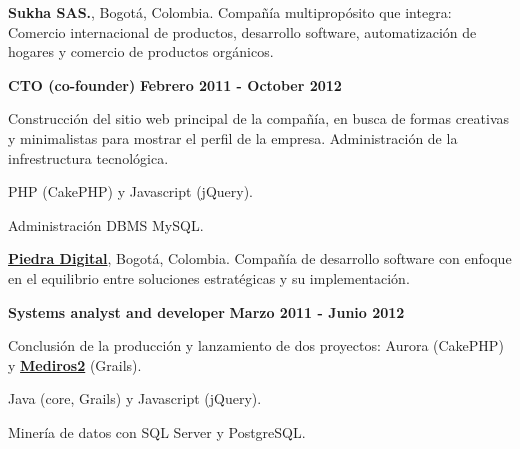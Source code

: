 \quarterblankline

% 

\textbf{Sukha SAS.}, Bogot\'a, Colombia.
Compa\~n\'ia multiprop\'osito que integra: Comercio internacional de productos,
desarrollo software, automatizaci\'on de hogares y comercio de productos
org\'anicos.
\begin{outerlist}
\item[] \textbf{CTO (co-founder)} \hfill \textbf{Febrero 2011 -
October 2012}
    \begin{innerlist}
\item Construcci\'on del sitio web principal de la compa\~n\'ia, en busca de
formas creativas y minimalistas para mostrar el perfil de la empresa.
Administraci\'on de la infrestructura tecnol\'ogica.
\item PHP (CakePHP) y Javascript (jQuery).
\item Administraci\'on DBMS MySQL.
    \end{innerlist}
\end{outerlist}

\quarterblankline

\href{http://www.piedradigital.com/}{\textbf{Piedra Digital}}, Bogot\'a,
Colombia. Compa\~n\'ia de desarrollo software con enfoque en el equilibrio entre
soluciones estrat\'egicas y su implementaci\'on.
\begin{outerlist}
\item[] \textbf{Systems analyst and developer} \hfill \textbf{Marzo 2011 - Junio
2012}
    \begin{innerlist}
\item Conclusi\'on de la producci\'on y lanzamiento de dos proyectos: Aurora
(CakePHP) y
\href{http://demo.100grados.co:8080/desempeno100/}{\textbf{Mediros2}} (Grails).
\item Java (core, Grails) y Javascript (jQuery).
\item Miner\'ia de datos con SQL Server y PostgreSQL.
    \end{innerlist}
\end{outerlist}

